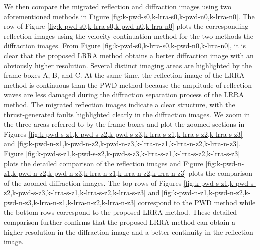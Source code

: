 We then compare the migrated reflection and diffraction images using two aforementioned methods in Figure \ref{fig:k-pwd-s0,k-lrra-s0,k-pwd-n0,k-lrra-n0}. The  row of Figure \ref{fig:k-pwd-s0,k-lrra-s0,k-pwd-n0,k-lrra-n0} plots the corresponding reflection images using the velocity continuation method \cite[]{fomel20037} for the two methods the diffraction images. From Figure \ref{fig:k-pwd-s0,k-lrra-s0,k-pwd-n0,k-lrra-n0}, it is clear that the proposed LRRA method obtains a better diffraction image with an obviously higher resolution. Several distinct imaging areas are highlighted by the frame boxes A, B, and C. At the same time, the reflection image of the LRRA method is  continuous than the PWD method because the amplitude of reflection waves are less damaged during the diffraction separation process of the LRRA method. The migrated reflection images indicate a clear  structure, with the thrust-generated faults highlighted clearly in the diffraction images.  We zoom in the three areas referred to by the frame boxes and plot the zoomed sections in Figures \ref{fig:k-pwd-s-z1,k-pwd-s-z2,k-pwd-s-z3,k-lrra-s-z1,k-lrra-s-z2,k-lrra-s-z3} and \ref{fig:k-pwd-n-z1,k-pwd-n-z2,k-pwd-n-z3,k-lrra-n-z1,k-lrra-n-z2,k-lrra-n-z3}. Figure \ref{fig:k-pwd-s-z1,k-pwd-s-z2,k-pwd-s-z3,k-lrra-s-z1,k-lrra-s-z2,k-lrra-s-z3}  plots the detailed comparison of the reflection images and Figure \ref{fig:k-pwd-n-z1,k-pwd-n-z2,k-pwd-n-z3,k-lrra-n-z1,k-lrra-n-z2,k-lrra-n-z3} plots the comparison of the zoomed diffraction images. The top rows of Figures \ref{fig:k-pwd-s-z1,k-pwd-s-z2,k-pwd-s-z3,k-lrra-s-z1,k-lrra-s-z2,k-lrra-s-z3}   and \ref{fig:k-pwd-n-z1,k-pwd-n-z2,k-pwd-n-z3,k-lrra-n-z1,k-lrra-n-z2,k-lrra-n-z3} correspond to the PWD method while the bottom rows correspond to the proposed LRRA method. These detailed comparison further confirms that the proposed LRRA method can obtain a higher resolution in the diffraction image and a better continuity in the reflection image. 


